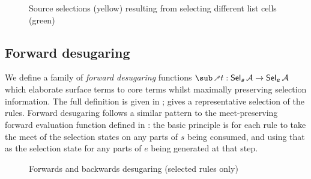 \begin{figure}
   \begin{subfigure}{0.48\textwidth}
      \small
      
   \end{subfigure}
   \hfill
   \begin{subfigure}{0.48\textwidth}
      \small
      
      \end{subfigure}
   \caption{Source selections (yellow) resulting from selecting different list cells (green)}
\label{fig:surface-language:example-1}
\end{figure}

\subsection{Forward desugaring}

We define a family of \textit{forward desugaring} functions $\desugarFwdF{t}: \Sel{\raw{s}}{A} \to \Sel{\raw{e}}{A}$ which elaborate surface terms to core terms whilst maximally preserving selection information. The full definition is \ifappendices given in  \else \IncludedWithSupplementaryMaterial \fi;  gives a representative selection of the rules. Forward desugaring follows a similar pattern to the meet-preserving forward evaluation function defined in : the basic principle is for each rule to take the meet of the selection states on any parts of $s$ being consumed, and using that as the selection state for any parts of $e$ being generated at that step.

\begin{figure}
   
   \caption{Forwards and backwards desugaring (selected rules only)}
   \label{fig:surface-language:desugar}
\end{figure}

